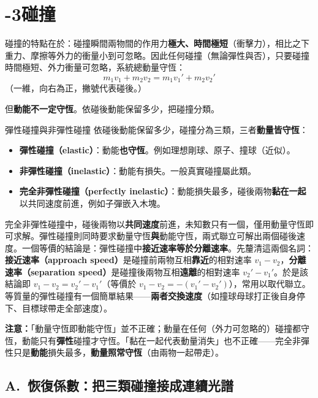 \documentclass[11pt]{article}
\begin{document}
\section*{-3\quad 碰撞}

碰撞的特點在於：碰撞瞬間兩物間的作用力\textbf{極大、時間極短}（衝擊力），相比之下重力、摩擦等外力的衝量小到可忽略。因此任何碰撞（無論彈性與否），只要碰撞時間極短、外力衝量可忽略，系統總動量守恆：
$$\boxed{\,m_1v_1+m_2v_2=m_1v_1'+m_2v_2'\,}$$
（一維，向右為正，撇號代表碰後。）

但\textbf{動能不一定守恆}。依碰後動能保留多少，把碰撞分類。


\begin{補充框}{彈性碰撞與非彈性碰撞}
依碰後動能保留多少，碰撞分為三類，三者\textbf{動量皆守恆}：
\begin{itemize}\setlength{\itemsep}{1pt}
\item \textbf{彈性碰撞（elastic）}：動能\textbf{也守恆}。例如理想剛球、原子、撞球（近似）。
\item \textbf{非彈性碰撞（inelastic）}：動能有損失。一般真實碰撞屬此類。
\item \textbf{完全非彈性碰撞（perfectly inelastic）}：動能損失最多，碰後兩物\textbf{黏在一起}以共同速度前進，例如子彈嵌入木塊。
\end{itemize}

完全非彈性碰撞中，碰後兩物以\textbf{共同速度}前進，未知數只有一個，僅用動量守恆即可求解。彈性碰撞則同時要求動量守恆\textbf{與}動能守恆，兩式聯立可解出兩個碰後速度。一個等價的結論是：彈性碰撞中\textbf{接近速率等於分離速率}。先釐清這兩個名詞：\textbf{接近速率（approach speed）}是碰撞前兩物互相\textbf{靠近}的相對速率 $v_1-v_2$，\textbf{分離速率（separation speed）}是碰撞後兩物互相\textbf{遠離}的相對速率 $v_2'-v_1'$。於是該結論即 $v_1-v_2=v_2'-v_1'$（等價於 $v_1-v_2=-(v_1'-v_2')$），常用以取代聯立。等質量的彈性碰撞有一個簡單結果——\textbf{兩者交換速度}（如撞球母球打正後自身停下、目標球帶走全部速度）。

\textbf{注意：}「動量守恆即動能守恆」並不正確；動量在任何（外力可忽略的）碰撞都守恆，動能只有\textbf{彈性}碰撞才守恆。「黏在一起代表動量消失」也不正確——完全非彈性只是\textbf{動能}損失最多，\textbf{動量照常守恆}（由兩物一起帶走）。
\end{補充框}

\subsection*{\sffamily A.\ 恢復係數：把三類碰撞接成連續光譜}
\end{document}
